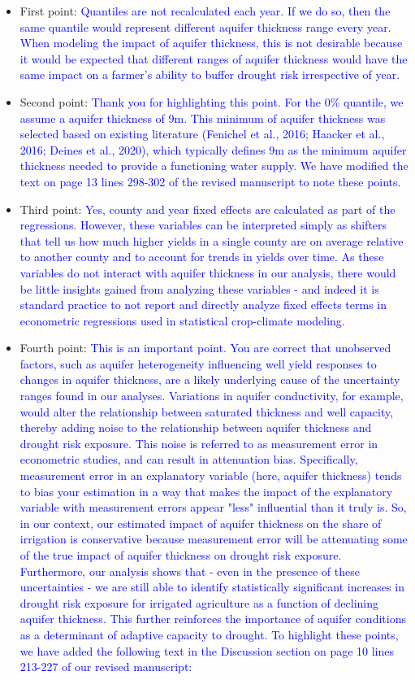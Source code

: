 \documentclass[
]{article}
\begin{document}
\begin{itemize}
\item
  First point:
  \textcolor{blue}{Quantiles are not recalculated each year. If we do so, then the same quantile would represent different aquifer thickness range every year. When modeling the impact of aquifer thickness, this is not desirable because it would be expected that different ranges of aquifer thickness would have the same impact on a farmer's ability to buffer drought risk irrespective of year.}
\item
  Second point:
  \textcolor{blue}{Thank you for highlighting this point. For the 0\% quantile, we assume a aquifer thickness of 9m. This minimum of aquifer thickness was selected based on existing literature (Fenichel et al., 2016; Haacker et al., 2016; Deines et al., 2020), which typically defines 9m as the minimum aquifer thickness needed to provide a functioning water supply. We have modified the text on page 13 lines 298-302 of the revised manuscript to note these points.}
\item
  Third point:
  \textcolor{blue}{Yes, county and year fixed effects are calculated as part of the regressions. However, these variables can be interpreted simply as shifters that tell us how much higher yields in a single county are on average relative to another county and to account for trends in yields over time. As these variables do not interact with aquifer thickness in our analysis, there would be little insights gained from analyzing these variables - and indeed it is standard practice to not report and directly analyze fixed effects terms in econometric regressions used in statistical crop-climate modeling.}
\item
  Fourth point:
  \textcolor{blue}{This is an important point. You are correct that unobserved factors, such as aquifer heterogeneity influencing well yield responses to changes in aquifer thickness, are a likely underlying cause of the uncertainty ranges found in our analyses. Variations in aquifer conductivity, for example, would alter the relationship between saturated thickness and well capacity, thereby adding noise to the relationship between aquifer thickness and drought risk exposure. This noise is referred to as measurement error in econometric studies, and can result in attenuation bias. Specifically, measurement error in an explanatory variable (here, aquifer thickness) tends to bias your estimation in a way that makes the impact of the explanatory variable with measurement errors appear "less" influential than it truly is. So, in our context, our estimated impact of aquifer thickness on the share of irrigation is conservative because measurement error will be attenuating some of the true impact of aquifer thickness on drought risk exposure. Furthermore, our analysis shows that - even in the presence of these uncertainties - we are still able to identify statistically significant increases in drought risk exposure for irrigated agriculture as a function of declining aquifer thickness. This further reinforces the importance of aquifer conditions as a determinant of adaptive capacity to drought. To highlight these points, we have added the following text in the Discussion section on page 10 lines 213-227 of our revised manuscript:}

\end{itemize}
\end{document}
